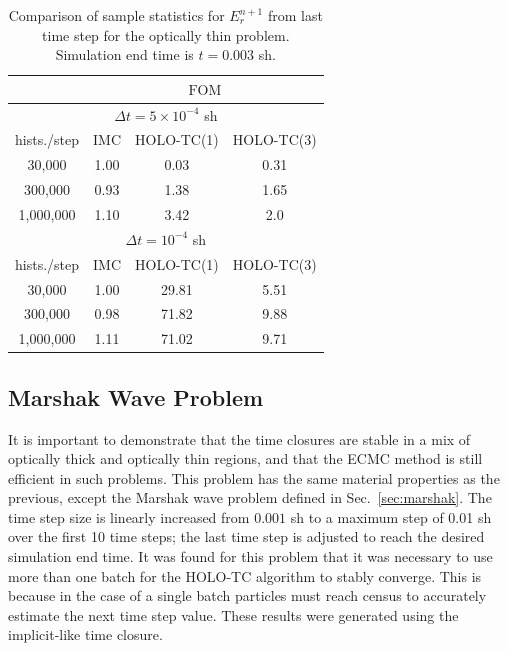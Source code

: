\documentclass{anstrans}
\newcommand{\FOM}{\ensuremath{\text{FOM}}}
\begin{document}
\begin{table}[H]
\centering
\caption{\label{tab:void_short} {Comparison of sample statistics for $E_r^{n+1}$ from last time step for the optically
    thin problem.  Simulation end time is $t=0.003$ sh.}}
\begin{tabular}{|c|ccc|}\cline{2-4}
    \multicolumn{1}{c|}{}       &
    \multicolumn{3}{|c|}{\FOM} \\ \hline
    \multicolumn{4}{|c|}{$\Delta t = 5\times10^{-4}$ sh} \\\hline
hists./step   &   IMC   & HOLO-TC(1) & HOLO-TC(3) \\ \hline
   30,000     &   1.00  & 0.03  &  0.31      \\
  300,000     &   0.93  & 1.38  &  1.65     \\ 
  1,000,000   &   1.10  & 3.42  &  2.0      \\ \hline
    \multicolumn{4}{|c|}{$\Delta t = 10^{-4}$ sh} \\\hline
hists./step   &  IMC   & HOLO-TC(1) & HOLO-TC(3) \\ \hline
   30,000     &  1.00  &  29.81    & 5.51    \\
  300,000     &  0.98  &  71.82    & 9.88    \\ 
  1,000,000   &  1.11  &  71.02    & 9.71    \\ \hline
\end{tabular}
\end{table}

\subsection{Marshak Wave Problem}

It is important to demonstrate that the time closures are stable in a mix of optically
thick and optically thin regions, and that the ECMC method is still efficient in such
problems.  This problem has the same material properties as the previous, except  the Marshak wave problem defined in
Sec.~\ref{sec:marshak}.  The time step size is linearly increased from $0.001$ sh to a
maximum step of 0.01 sh over the first 10 time steps; the last time step is adjusted to
reach the desired simulation end time.  It was found for this problem that it was
necessary to use more than one batch for the HOLO-TC algorithm to stably converge.
This is because in the case of a single batch particles must reach
census to accurately estimate the next time step value.  These results were generated using the implicit-like time
closure.
\end{document}

